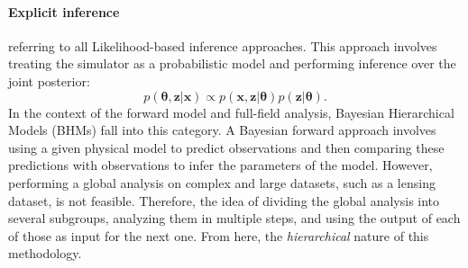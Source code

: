 \documentclass{aa}
\begin{document}
\paragraph{\textbf{Explicit inference}} referring to all Likelihood-based inference approaches.  
This approach involves treating the simulator as a probabilistic model and performing inference over the joint posterior:
\begin{equation}
        p(\bm{\theta},\bm{z}|\bm{x})\propto  p(\bm{x},\bm{z}|\bm{\theta}) p(\bm{z}|\bm{\theta}).
\end{equation}
In the context of the forward model and full-field analysis, Bayesian Hierarchical Models (BHMs) fall into this category.
A Bayesian forward approach involves using a given physical model to predict observations and then comparing these predictions with observations to infer the parameters of the model.
However, performing a global analysis on complex and large datasets, such as a lensing dataset, is not feasible. Therefore, the idea of dividing the global analysis into several subgroups, analyzing them in multiple steps, and using the output of each of those as input for the next one. From here, the \textit{hierarchical} nature of this methodology.
\end{document}
